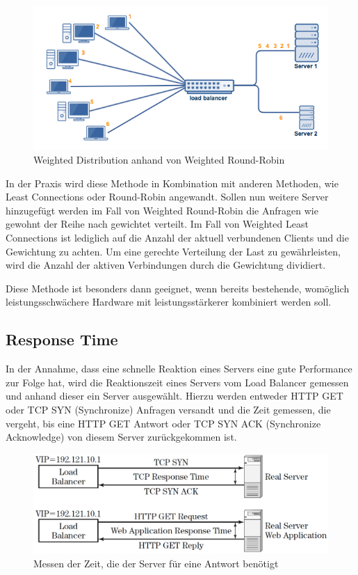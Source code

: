 \begin{figure}[!ht]
	\begin{center}
		\includegraphics[width=0.8\linewidth]{images/weighted_round_robin.png}
		\caption{Weighted Distribution anhand von Weighted Round-Robin \cite{WeightedLoadBalancingGrafik}}
		\label{Weighted Round-Robin}
	\end{center}
\end{figure}

In der Praxis wird diese Methode in Kombination mit anderen Methoden, wie Least Connections oder Round-Robin angewandt.
Sollen nun weitere Server hinzugefügt werden im Fall von Weighted Round-Robin die Anfragen wie gewohnt der Reihe nach gewichtet verteilt. Im Fall von Weighted Least Connections ist lediglich auf die Anzahl der aktuell verbundenen Clients und die Gewichtung zu achten. Um eine gerechte Verteilung der Last zu gewährleisten, wird die Anzahl der aktiven Verbindungen durch die Gewichtung dividiert.

Diese Methode ist besonders dann geeignet, wenn bereits bestehende, womöglich leistungsschwächere Hardware mit leistungsstärkerer kombiniert werden soll.
\cite{LoadBalancing2}

\subsection{Response Time}
\label{sec:Response Time}
In der Annahme, dass eine schnelle Reaktion eines Servers eine gute Performance zur Folge hat, wird die Reaktionszeit eines Servers vom Load Balancer gemessen und anhand dieser ein Server ausgewählt. Hierzu werden entweder HTTP GET oder TCP SYN (Synchronize) Anfragen versandt und die Zeit gemessen, die vergeht, bis eine HTTP GET Antwort oder TCP SYN ACK (Synchronize Acknowledge) von diesem Server zurückgekommen ist. \cite{LoadBalancing2}

\begin{figure}[!ht]
	\begin{center}
		\includegraphics[width=0.8\linewidth]{images/LoadBalancing_Response_Time.png}
		\caption{Messen der Zeit, die der Server für eine Antwort benötigt \cite{LoadBalancing2}}
		\label{ResponseTime}
	\end{center}
\end{figure}


